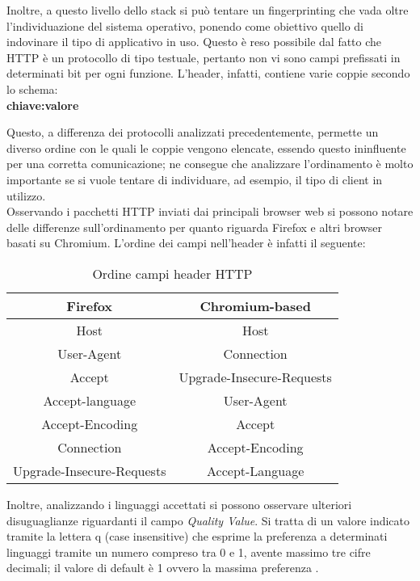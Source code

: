 Inoltre, a questo livello dello stack si può tentare un fingerprinting che vada oltre l'individuazione del sistema operativo, ponendo come obiettivo quello di indovinare il tipo di applicativo in uso.
Questo è reso possibile dal fatto che HTTP è un protocollo di tipo testuale, pertanto non vi sono campi prefissati in determinati bit per ogni funzione.
L'header, infatti, contiene varie coppie secondo lo schema:\\
\textbf{chiave:valore} 


Questo, a differenza dei protocolli analizzati precedentemente, permette un diverso ordine con le quali le coppie vengono elencate, essendo questo ininfluente per una corretta comunicazione; ne consegue che analizzare l'ordinamento è molto importante se si vuole tentare di individuare, ad esempio, il tipo di client in utilizzo.\\

Osservando i pacchetti HTTP inviati dai principali browser web si possono notare delle differenze sull'ordinamento per quanto riguarda Firefox e altri browser basati su Chromium.
L'ordine dei campi nell'header è infatti il seguente:

\begin{table}[h]
	\centering
	\begin{tabular}{| c | c |}
		\hline
		\textbf{Firefox} & \textbf{Chromium-based}
		\\
		\hline
		Host & Host
		\\
		\hline
		User-Agent & Connection
		\\
		\hline
		Accept & Upgrade-Insecure-Requests
		\\
		\hline
		Accept-language & User-Agent
		\\
		\hline
		Accept-Encoding & Accept
		\\
		\hline
		Connection & Accept-Encoding
		\\
		\hline
		Upgrade-Insecure-Requests & Accept-Language
		\\
		\hline
	\end{tabular}
	\caption{Ordine campi header HTTP}
	\label{tab:ordineHTTP}
\end{table}

Inoltre, analizzando i linguaggi accettati si possono osservare ulteriori disuguaglianze riguardanti il campo \textit{Quality Value}.
Si tratta di un valore indicato tramite la lettera q (case insensitive) che esprime la preferenza a determinati linguaggi tramite un numero compreso tra 0 e 1, avente massimo tre cifre decimali; il valore di default è 1 ovvero la massima preferenza \cite{qvalue}. 

